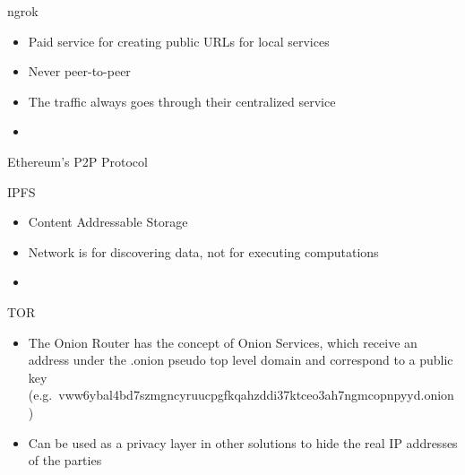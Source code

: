 \hypertarget{notes__02100-ngrok.md}{}
\begin{block}{ngrok}
\protect\hypertarget{notes__02100-ngrok.md__ngrok}{}
\begin{itemize}
\tightlist
\item
  Paid service for creating public URLs for local services
\item
  Never peer-to-peer
\item
  The traffic always goes through their centralized service
\item
\end{itemize}
\end{block}

\hypertarget{notes__02110-ethereum.md}{}
\begin{block}{Ethereum's P2P Protocol}
\protect\hypertarget{notes__02110-ethereum.md__ethereums-p2p-protocol}{}
\end{block}

\hypertarget{notes__02120-ipfs.md}{}
\begin{block}{IPFS}
\protect\hypertarget{notes__02120-ipfs.md__ipfs}{}
\begin{itemize}
\tightlist
\item
  Content Addressable Storage
\item
  Network is for discovering data, not for executing computations
\item
\end{itemize}
\end{block}

\hypertarget{notes__02130-tor.md}{}
\begin{block}{TOR}
\protect\hypertarget{notes__02130-tor.md__tor}{}
\begin{itemize}
\tightlist
\item
  The Onion Router has the concept of Onion Services, which receive an
  address under the .onion pseudo top level domain and correspond to a
  public key
  (e.g.~vww6ybal4bd7szmgncyruucpgfkqahzddi37ktceo3ah7ngmcopnpyyd.onion)
\item
  Can be used as a privacy layer in other solutions to hide the real IP
  addresses of the parties
\end{itemize}
\end{block}

